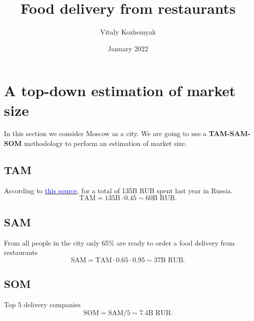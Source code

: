 \documentclass[11pt]{article}
\title{Food delivery from restaurants}
\author{Vitaly Kozhemyak}
\date{January 2022}
\begin{document}
\maketitle
\section{A top-down estimation of market size}
In this section we consider Moscow as a city. We are going to use a \textbf{TAM-SAM-SOM} methodology to perform an estimation of market size.
\subsection{TAM}
According to \href{https://acdn.tinkoff.ru/static/documents/market-for-delivery-food-groceries-and-ready-made-rations.pdf}{\textcolor{blue}{this source}}, for a total of 135B RUB spent last year in Russia. 
$$
\text{TAM} = 135 \text{B} \cdot 0.45 \sim 60 \text{B RUB.}
$$
\subsection{SAM}
From all people in the city only 65\% are ready to order a food delivery from restaurants
$$
\text{SAM} = \text{TAM} \cdot 0.65 \cdot 0.95 \sim 37 \text{B RUB.}
$$
\subsection{SOM}
Top 5 delivery companies
$$
\text{SOM} = \text{SAM} / 5 \sim 7.4 \text{B RUB.}
$$
\end{document}
